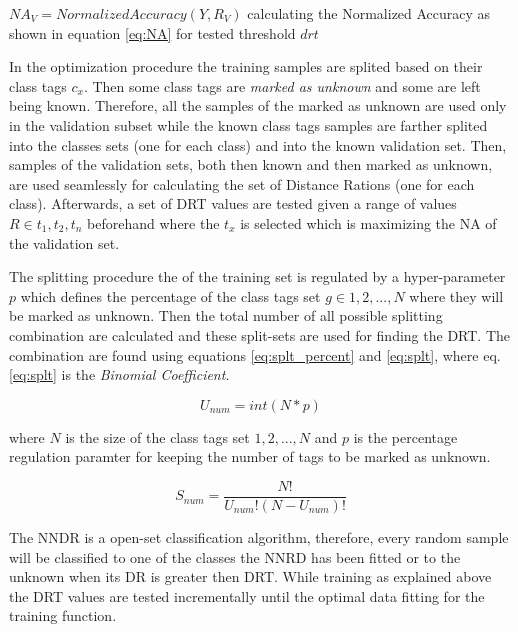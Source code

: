 \documentclass[runningheads]{llncs}
\begin{document}
\begin{algorithm}[H]
{{    }

    $NA_{V} = NormalizedAccuracy(Y, R_{V})$ calculating the Normalized Accuracy as shown in equation \ref{eq:NA} for tested threshold $drt$\;


}

\end{algorithm}
In the optimization procedure the training samples are splited based on their class tags $c_{x}$. Then some class tags are \textit{marked as unknown} and some are left being known. Therefore, all the samples of the marked as unknown are used only in the validation subset while the known class tags samples are farther splited into the classes sets (one for each class) and into the known validation set. Then, samples of the validation sets, both then known and then marked as unknown, are used seamlessly for calculating the set of Distance Rations (one for each class). Afterwards, a set of DRT values are tested given a range of values $R \in {t_{1}, t_{2}, t_{n}}$ beforehand where the $t_{x}$ is selected which is maximizing the NA of the validation set.

The splitting procedure the of the training set is regulated by a hyper-parameter $p$ which defines the percentage of the class tags set $g \in {1,2,...,N}$ where they will be marked as unknown. Then the total number of all possible splitting combination are calculated and these split-sets are used for finding the DRT. The combination are found using equations \ref{eq:splt_percent} and \ref{eq:splt}, where eq.\ref{eq:splt} is the \textit{Binomial Coefficient}.

\begin{equation} \label{eq:splt_percent}
    U_{num} = int(N * p)
\end{equation}

\noindent
where $N$ is the size of the class tags set ${1,2,...,N}$ and $p$ is the percentage regulation paramter for keeping the number of tags to be marked as unknown.

\begin{equation} \label{eq:splt}
    S_{num} = \frac{N!}{U_{num}!(N-U_{num})!}
\end{equation}

The NNDR is a open-set classification algorithm, therefore, every random sample will be classified to one of the classes the NNRD has been fitted or to the unknown when its DR is greater then DRT. While training as explained above the DRT values are tested incrementally until the optimal data fitting for the training function.
\end{document}
